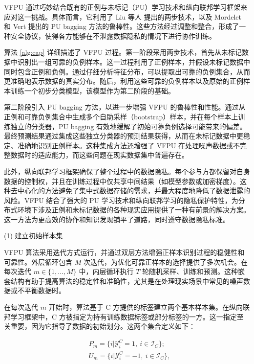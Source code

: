 VFPU 通过巧妙结合既有的正例与未标记（PU）学习技术和纵向联邦学习框架来应对这一挑战。具体而言，它利用了 Liu 等人 \textsuperscript{\cite{liu2003building}} 提出的两步技术，以及 Mordelet 和 Vert \textsuperscript{\cite{mordelet2014bagging}} 提出的 PU bagging 方法的鲁棒性。这些方法经过调整和整合，形成了一种安全协议，使得各方能够在不泄露数据隐私的情况下进行协作训练。

算法 \ref{alg:cap} 详细描述了 VFPU 过程。第一阶段采用两步技术，首先从未标记数据中识别出一组可靠的负例样本。这一过程利用了正例样本，并假设未标记数据中同时包含正例和负例。通过仔细分析特征分布，可以提取出可靠的负例集合，从而更准确地表示数据的真实分布。随后，利用这些可靠的负例样本以及原始的正例样本训练一个初步分类模型，该模型作为第二阶段的基础。

第二阶段引入 PU bagging 方法，以进一步增强 VFPU 的鲁棒性和性能。通过从正例和可靠负例集合中生成多个自助采样（bootstrap）样本，并在每个样本上训练独立的分类器，PU bagging 有效地缓解了初始可靠负例选择可能带来的偏差。最终预测结果通过集成这些独立分类器的预测结果获得，从而在未标记数据中更稳定、准确地识别正例样本。这种集成方法还增强了 VFPU 在处理噪声数据或不完整数据时的适应能力，而这些问题在现实数据集中普遍存在。

此外，纵向联邦学习框架确保了整个过程中的数据隐私。每个参与方都保留对自身数据的控制权，并且在训练过程中仅共享中间结果（如模型参数或加密梯度）。这种去中心化的方法避免了集中式数据存储的需求，并最大程度地降低了数据泄露的风险。VFPU 结合了强大的 PU 学习技术和纵向联邦学习的隐私保护特性，为分布式环境下涉及正例和未标记数据的各种现实应用提供了一种有前景的解决方案。这一方法为更高效的协作和知识发现铺平了道路，同时遵守数据隐私标准。

(1) 建立初始样本集

VFPU 算法采用迭代方式运行，并通过双层方法增强正样本识别过程的稳健性和可靠性。外层循环包含 $M$ 次迭代，为优化可靠正样本的选择提供了多次机会。在每次迭代 $m \in \{1, ..., M\}$ 中，内层循环执行 $T$ 轮随机采样、训练和预测。这种嵌套结构有助于提高算法的稳定性和准确性，尤其是在处理现实场景中常见的噪声数据或不平衡数据时。

在每次迭代 $m$ 开始时，算法基于 C 方提供的标签建立两个基本样本集。在纵向联邦学习框架中，C 方被指定为持有训练数据标签或部分标签的一方。这一指定至关重要，因为它指导了数据的初始划分。这两个集合定义如下：

\begin{equation}
	\begin{split}
		&{{P}_{m}}=\{i|\mathsf{\mathcal{Y}}_{i}^{C}=1,\ i\in {{\mathsf{\mathcal{I}}}_{C}}\};\\
		&{{U}_{m}}=\{i|\mathsf{\mathcal{Y}}_{i}^{C}=-1,\ i\in {{\mathsf{\mathcal{I}}}_{C}}\},
	\end{split}
\end{equation}

